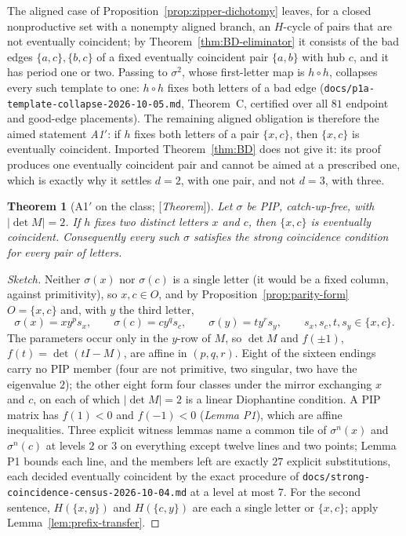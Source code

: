 \documentclass[11pt]{amsart}
\theoremstyle{plain}
\newtheorem{theorem}{Theorem}[section]
\theoremstyle{definition}
\theoremstyle{remark}
\newcommand{\Status}[1]{\textup{[\textit{#1}]}}
\begin{document}
The aligned case of Proposition~\ref{prop:zipper-dichotomy} leaves, for a closed nonproductive set with a nonempty aligned branch, an $H$-cycle of pairs that are not eventually coincident; by Theorem~\ref{thm:BD-eliminator} it consists of the bad edges $\{a,c\},\{b,c\}$ of a fixed eventually coincident pair $\{a,b\}$ with hub $c$, and it has period one or two. Passing to $\sigma^2$, whose first-letter map is $h\circ h$, collapses every such template to one: $h\circ h$ fixes both letters of a bad edge (\texttt{docs/p1a-template-collapse-2026-10-05.md}, Theorem~C, certified over all $81$ endpoint and good-edge placements). The remaining aligned obligation is therefore the aimed statement \emph{A1$'$}: if $h$ fixes both letters of a pair $\{x,c\}$, then $\{x,c\}$ is eventually coincident. Imported Theorem~\ref{thm:BD} does not give it: its proof produces one eventually coincident pair and cannot be aimed at a prescribed one, which is exactly why it settles $d=2$, with one pair, and not $d=3$, with three.

\begin{theorem}[A1$'$ on the class; \Status{Theorem}]\label{thm:A1-class}
Let $\sigma$ be PIP, catch-up-free, with $|\det M|=2$. If $h$ fixes two distinct letters $x$ and $c$, then $\{x,c\}$ is eventually coincident. Consequently every such $\sigma$ satisfies the strong coincidence condition for every pair of letters.
\end{theorem}
\begin{proof}[Sketch]
Neither $\sigma(x)$ nor $\sigma(c)$ is a single letter (it would be a fixed column, against primitivity), so $x,c\in O$, and by Proposition~\ref{prop:parity-form} $O=\{x,c\}$ and, with $y$ the third letter,
\[
\sigma(x)=xy^ps_x,\qquad\sigma(c)=cy^qs_c,\qquad\sigma(y)=ty^rs_y,\qquad s_x,s_c,t,s_y\in\{x,c\}.
\]
The parameters occur only in the $y$-row of $M$, so $\det M$ and $f(\pm1)$, $f(t)=\det(tI-M)$, are affine in $(p,q,r)$. Eight of the sixteen endings carry no PIP member (four are not primitive, two singular, two have the eigenvalue $2$); the other eight form four classes under the mirror exchanging $x$ and $c$, on each of which $|\det M|=2$ is a linear Diophantine condition. A PIP matrix has $f(1)<0$ and $f(-1)<0$ (\emph{Lemma P1}), which are affine inequalities. Three explicit witness lemmas name a common tile of $\sigma^n(x)$ and $\sigma^n(c)$ at levels $2$ or $3$ on everything except twelve lines and two points; Lemma P1 bounds each line, and the members left are exactly $27$ explicit substitutions, each decided eventually coincident by the exact procedure of \texttt{docs/strong-coincidence-census-2026-10-04.md} at a level at most $7$. For the second sentence, $H(\{x,y\})$ and $H(\{c,y\})$ are each a single letter or $\{x,c\}$; apply Lemma~\ref{lem:prefix-transfer}.
\end{proof}
\end{document}
